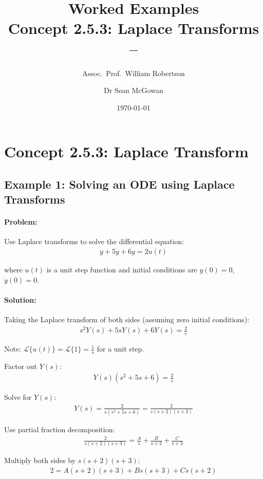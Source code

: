 \documentclass[11pt,a4paper]{article}
\title{\textbf{Worked Examples}\\[0.5em]
\large Concept 2.5.3: Laplace Transforms\\[0.3em]
\normalsize \coursesubtitle{} -- \coursetitle}
\author{Assoc.\ Prof.\ William Robertson \and Dr Sean McGowan}
\date{\today}
\begin{document}
\maketitle
\tableofcontents
\newpage

\section{Concept 2.5.3: Laplace Transform}

\subsection{Example 1: Solving an ODE using Laplace Transforms}

\paragraph{Problem:} Use Laplace transforms to solve the differential equation:
\begin{align}
  \ddot{y} + 5\dot{y} + 6y = 2u(t)
\end{align}

where $u(t)$ is a unit step function and initial conditions are $y(0) = 0$, $\dot{y}(0) = 0$.

\paragraph{Solution:}

Taking the Laplace transform of both sides (assuming zero initial conditions):
\begin{align}
  s^2Y(s) + 5sY(s) + 6Y(s) = \frac{2}{s}
\end{align}

Note: $\mathcal{L}\{u(t)\} = \mathcal{L}\{1\} = \frac{1}{s}$ for a unit step.

Factor out $Y(s)$:
\begin{align}
  Y(s)(s^2 + 5s + 6) = \frac{2}{s}
\end{align}

Solve for $Y(s)$:
\begin{align}
  Y(s) = \frac{2}{s(s^2+5s+6)} = \frac{2}{s(s+2)(s+3)}
\end{align}

Use partial fraction decomposition:
\begin{align}
  \frac{2}{s(s+2)(s+3)} = \frac{A}{s} + \frac{B}{s+2} + \frac{C}{s+3}
\end{align}

Multiply both sides by $s(s+2)(s+3)$:
\begin{align}
  2 = A(s+2)(s+3) + Bs(s+3) + Cs(s+2)
\end{align}
\end{document}
